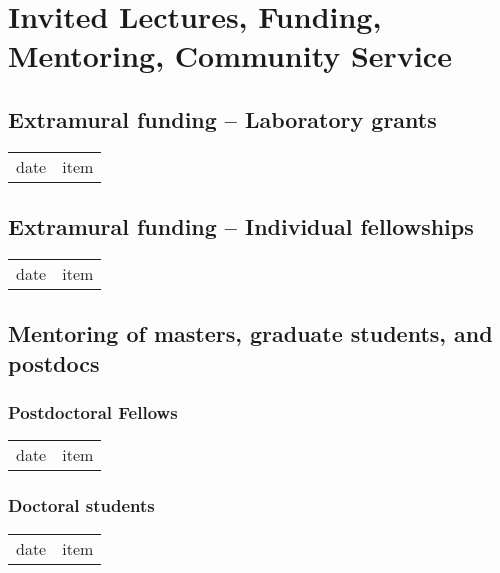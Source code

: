 \chapter{Invited Lectures, Funding, Mentoring, Community Service}
\label{CommunityService}

\vspace{-10mm}






\section{Extramural funding – Laboratory grants}
\begin{tabular}[l]{ p{} p{} }
date & item\\
\end{tabular} 

\section{Extramural funding – Individual fellowships}
\begin{tabular}[l]{ p{} p{} }
date & item\\
\end{tabular} 

\section{Mentoring of masters, graduate students, and postdocs}

\subsection{Postdoctoral Fellows}
\begin{tabular}[l]{ p{} p{} }
date & item\\
\end{tabular} 

\subsection{Doctoral students}
\begin{tabular}[l]{ p{} p{} }
date & item\\
\end{tabular} 

